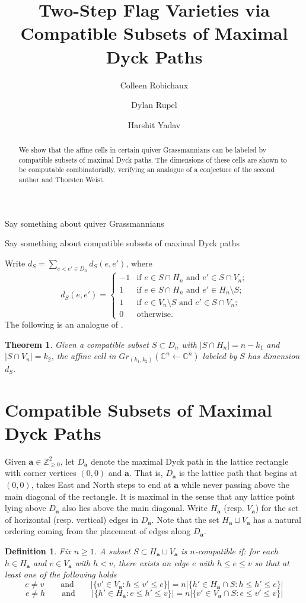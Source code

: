 \documentclass{amsart}
\title{Two-Step Flag Varieties via\\ Compatible Subsets of Maximal Dyck Paths}
\author{Colleen Robichaux}
\author{Dylan Rupel}
\author{Harshit Yadav}
\newtheorem{thm}{Theorem}
\newtheorem{dfn}{Definition}
\newcommand{\CC}{\mathbb{C}}
\newcommand{\ZZ}{\mathbb{Z}}
\newcommand{\bfa}{\mathbf{a}}
\begin{document}
  \begin{abstract}
    We show that the affine cells in certain quiver Grassmannians can be labeled by compatible subsets of maximal Dyck paths.
    The dimensions of these cells are shown to be computable combinatorially, verifying an analogue of a conjecture of the second author and Thorsten Weist.
  \end{abstract}
  \maketitle

  Say something about quiver Grassmannians

  Say something about compatible subsets of maximal Dyck paths

  Write $d_S=\sum\limits_{e<e'\in D_n} d_S(e,e')$, where
  \[
    d_S(e,e')=
    \begin{cases}
      -1 & \text{if $e\in S\cap H_n$ and $e'\in S\cap V_n$;}\\
      1 & \text{if $e\in S\cap H_n$ and $e'\in H_n\setminus S$;}\\
      1 & \text{if $e\in V_n\setminus S$ and $e'\in S\cap V_n$;}\\
      0 & \text{otherwise.}
    \end{cases}
  \]
  The following is an analogue of \cite[Conjecture 5.21]{rupel-weist}.
  \begin{thm}
    Given a compatible subset $S\subset D_n$ with $|S\cap H_n|=n-k_1$ and $|S\cap V_n|=k_2$, the affine cell in $Gr_{(k_1,k_2)}(\CC^n\leftarrow\CC^n)$ labeled by $S$ has dimension $d_S$.
  \end{thm}

  \section{Compatible Subsets of Maximal Dyck Paths}
  Given $\bfa\in\ZZ_{\ge0}^2$, let $D_\bfa$ denote the maximal Dyck path in the lattice rectangle with corner vertices $(0,0)$ and $\bfa$.
  That is, $D_\bfa$ is the lattice path that begins at $(0,0)$, takes East and North steps to end at $\bfa$ while never passing above the main diagonal of the rectangle.
  It is maximal in the sense that any lattice point lying above $D_\bfa$ also lies above the main diagonal.
  Write $H_\bfa$ (resp. $V_\bfa$) for the set of horizontal (resp. vertical) edges in $D_\bfa$.
  Note that the set $H_\bfa\sqcup V_\bfa$ has a natural ordering coming from the placement of edges along $D_\bfa$. 

  \begin{dfn}
    Fix $n\ge1$.
    A subset $S\subset H_\bfa\sqcup V_\bfa$ is \emph{$n$-compatible} if: for each $h\in H_\bfa$ and $v\in V_\bfa$ with $h<v$, there exists an edge $e$ with $h\le e\le v$ so that at least one of the following holds
    \[e\ne v \qquad \text{and} \qquad \big|\{v'\in V_\bfa:h\le v'\le e\}\big|=n\big|\{h'\in H_\bfa\cap S:h\le h'\le e\}\big|\]
    \[e\ne h \qquad \text{and} \qquad \big|\{h'\in H_\bfa:e\le h'\le v\}\big|=n\big|\{v'\in V_\bfa\cap S:e\le v'\le v\}\big|\]
  \end{dfn}
\end{document}
